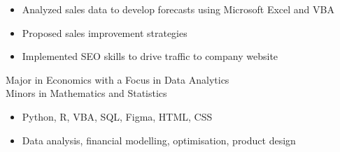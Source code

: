 \documentclass[10pt,a4paper,ragged2e]{altacv}
\begin{document}
\divider

\begin{itemize}
    \item Analyzed sales data to develop forecasts using Microsoft Excel and VBA
    \item Proposed sales improvement strategies
    \item Implemented SEO skills to drive traffic to company website
\end{itemize}

Major in Economics with a Focus in Data Analytics \\ Minors in Mathematics and Statistics


\begin{itemize}
    \item Python, R, VBA, SQL, Figma, HTML, CSS
    \item Data analysis, financial modelling, optimisation, product design
\end{itemize}

\clearpage
\nocite{*}
\end{document}
